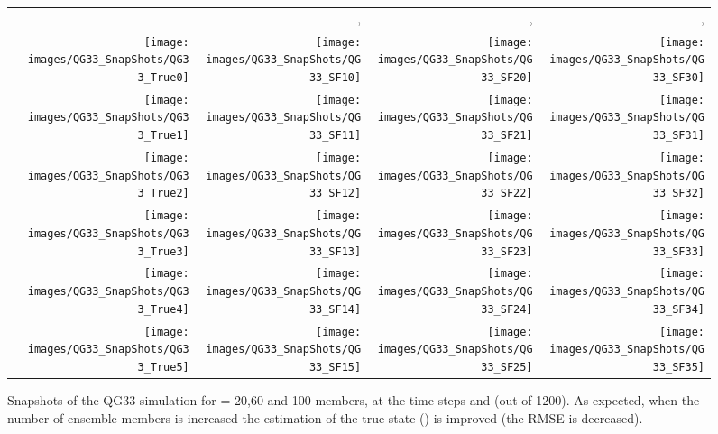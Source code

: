 \documentclass[12pt]{article}
\begin{document}
\begin{figure}[H]
\centering
\begin{tabular}{VNNNN}
&  & ,  & ,  & , \\ 
 &\texttt{[image: images/QG33\_SnapShots/QG33\_True0]} &\texttt{[image: images/QG33\_SnapShots/QG33\_SF10]} &\texttt{[image: images/QG33\_SnapShots/QG33\_SF20]} &\texttt{[image: images/QG33\_SnapShots/QG33\_SF30]} \\
\begin{sideways}  \end{sideways} &\texttt{[image: images/QG33\_SnapShots/QG33\_True1]} &\texttt{[image: images/QG33\_SnapShots/QG33\_SF11]} &\texttt{[image: images/QG33\_SnapShots/QG33\_SF21]} &\texttt{[image: images/QG33\_SnapShots/QG33\_SF31]} \\
\begin{sideways}  \end{sideways} &\texttt{[image: images/QG33\_SnapShots/QG33\_True2]} &\texttt{[image: images/QG33\_SnapShots/QG33\_SF12]} &\texttt{[image: images/QG33\_SnapShots/QG33\_SF22]} &\texttt{[image: images/QG33\_SnapShots/QG33\_SF32]} \\
\begin{sideways}  \end{sideways} &\texttt{[image: images/QG33\_SnapShots/QG33\_True3]} &\texttt{[image: images/QG33\_SnapShots/QG33\_SF13]} &\texttt{[image: images/QG33\_SnapShots/QG33\_SF23]} &\texttt{[image: images/QG33\_SnapShots/QG33\_SF33]} \\
\begin{sideways}  \end{sideways} &\texttt{[image: images/QG33\_SnapShots/QG33\_True4]} &\texttt{[image: images/QG33\_SnapShots/QG33\_SF14]} &\texttt{[image: images/QG33\_SnapShots/QG33\_SF24]} &\texttt{[image: images/QG33\_SnapShots/QG33\_SF34]} \\
\begin{sideways}  \end{sideways} &\texttt{[image: images/QG33\_SnapShots/QG33\_True5]} &\texttt{[image: images/QG33\_SnapShots/QG33\_SF15]} &\texttt{[image: images/QG33\_SnapShots/QG33\_SF25]} &\texttt{[image: images/QG33\_SnapShots/QG33\_SF35]} 
\end{tabular}
\caption{Snapshots of the QG33 simulation for  = 20,60 and 100 members, at the time steps  and  (out of 1200). As expected, when the number of ensemble members is increased the estimation of the true state () is improved (the RMSE is decreased).
}
\label{Fig:QG33-Snapshots-Simulation}
\end{figure}
\end{document}

